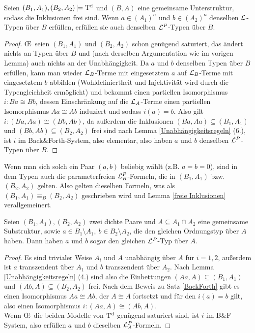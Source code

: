 \begin{lemma}\label{Gemeinsame Unterstruktur}
	Seien $(B_1,A_1),(B_2,A_2)\models\operatorname{T^d}$ und $(B,A)$ eine gemeinsame Unterstruktur, sodass die Inklusionen frei sind. Wenn $a\in (A_1)^n$ und $b\in (A_2)^n$ denselben $\mathcal{L}$-Typen über $B$ erfüllen, erfüllen sie auch denselben $\mathcal{L}^P$-Typen über $B$.
\end{lemma}
\begin{proof}
	\OE\ seien $(B_1,A_1)$ und $(B_2,A_2)$ schon genügend saturiert, das ändert nichts an Typen über $B$ und (nach derselben Argumentation wie im vorigen Lemma) auch nichts an der Unabhängigkeit. Da $a$ und $b$ denselben Typen über $B$ erfüllen, kann man wieder $\mathcal{L}_B$-Terme mit eingesetztem $a$ auf $\mathcal{L}_B$-Terme mit eingesetztem $b$ abbilden (Wohldefiniertheit und Injektivität wird durch die Typengleichheit ermöglicht) und bekommt einen partiellen Isomorphismus $i:Ba\cong Bb$, dessen Einschränkung auf die $\mathcal{L}_A$-Terme einen partiellen Isomorphismus $Aa\cong Ab$ induziert und sodass $i(a)=b$. Also gilt $i:(Ba,Aa)\cong(Bb,Ab)$, da außerdem die Inklusionen $(Ba,Aa)\subseteq(B_1,A_1)$ und $(Bb,Ab)\subseteq(B_2,A_2)$ frei sind nach Lemma \ref{Unabhängigkeitsregeln} (6.), ist $i$ im Back\&Forth-System, also elementar, also haben $a$ und $b$ denselben $\mathcal{L}^P$-Typen über $B$.
\end{proof}

\begin{corollary}
	Wenn man sich solch ein Paar $(a,b)$ beliebig wählt (z.B. $a=b=0$), sind in dem Typen auch die parameterfreien $\mathcal{L}^P_B$-Formeln, die in $(B_1,A_1)$ bzw. $(B_2,A_2)$ gelten. Also gelten dieselben Formeln, was als $(B_1,A_1)\equiv_B(B_2,A_2)$ geschrieben wird und Lemma \ref{freie Inklusionen} verallgemeinert.
\end{corollary}

\begin{lemma}\label{selber Schnitt}
	Seien $(B_1,A_1),(B_2,A_2)$ zwei dichte Paare und $A\subseteq A_1\cap A_2$ eine gemeinsame Substruktur, sowie $a\in B_1\setminus A_1,\ b\in B_2\setminus A_2$, die den gleichen Ordnungstyp über $A$ haben. Dann haben $a$ und $b$ sogar den gleichen $\mathcal{L}^P$-Typ über $A$.
\end{lemma}
\begin{proof}
	Es sind trivialer Weise $A_i$ und $A$ unabhängig über $A$ für $i=1,2$, außerdem ist $a$ transzendent über $A_1$ und $b$ transzendent über $A_2$. Nach Lemma \ref{Unabhängigkeitsregeln} (4.) sind also die Einbettungen $(Aa,A)\subseteq(B_1,A_1)$ und $(Ab,A)\subseteq(B_2,A_2)$ frei. Nach dem Beweis zu Satz \ref{BackForth} gibt es einen Isomorphismus $Aa\cong Ab$, der $A\cong A$ fortsetzt und für den $i(a)=b$ gilt, also einen Isomorphismus $i:(Aa,A)\cong(Ab,A)$.\\ Wenn \OE\ die beiden Modelle von $\operatorname{T^d}$ genügend saturiert sind, ist $i$ im B\&F-System, also erfüllen $a$ und $b$ dieselben $\mathcal{L}^P_A$-Formeln.
\end{proof}

